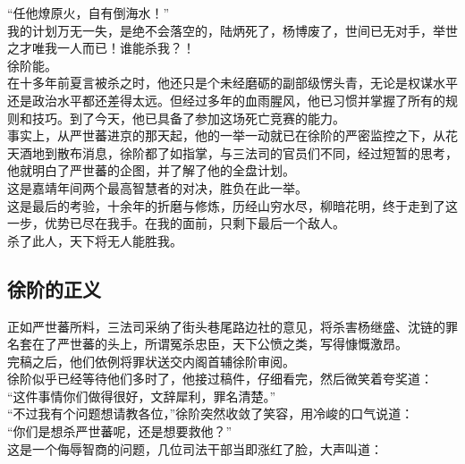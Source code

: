 \begin{multicols}{\theparacolNo}
“任他燎原火，自有倒海水！”\\

我的计划万无一失，是绝不会落空的，陆炳死了，杨博废了，世间已无对手，举世之才唯我一人而已！谁能杀我？！\\

徐阶能。\\

在十多年前夏言被杀之时，他还只是个未经磨砺的副部级愣头青，无论是权谋水平还是政治水平都还差得太远。但经过多年的血雨腥风，他已习惯并掌握了所有的规则和技巧。到了今天，他已具备了参加这场死亡竞赛的能力。\\

事实上，从严世蕃进京的那天起，他的一举一动就已在徐阶的严密监控之下，从花天酒地到散布消息，徐阶都了如指掌，与三法司的官员们不同，经过短暂的思考，他就明白了严世蕃的企图，并了解了他的全盘计划。\\

这是嘉靖年间两个最高智慧者的对决，胜负在此一举。\\

这是最后的考验，十余年的折磨与修炼，历经山穷水尽，柳暗花明，终于走到了这一步，优势已尽在我手。在我的面前，只剩下最后一个敌人。\\

杀了此人，天下将无人能胜我。\\

\subsection{徐阶的正义}
正如严世蕃所料，三法司采纳了街头巷尾路边社的意见，将杀害杨继盛、沈链的罪名套在了严世蕃的头上，所谓冤杀忠臣，天下公愤之类，写得慷慨激昂。\\

完稿之后，他们依例将罪状送交内阁首辅徐阶审阅。\\

徐阶似乎已经等待他们多时了，他接过稿件，仔细看完，然后微笑着夸奖道：\\

“这件事情你们做得很好，文辞犀利，罪名清楚。”\\

“不过我有个问题想请教各位，”徐阶突然收敛了笑容，用冷峻的口气说道：\\

“你们是想杀严世蕃呢，还是想要救他？”\\

这是一个侮辱智商的问题，几位司法干部当即涨红了脸，大声叫道：\\


\end{multicols}
